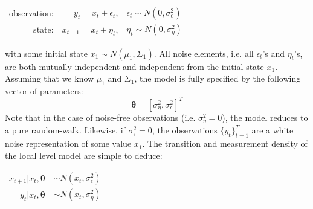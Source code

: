 \documentclass[11pt, oneside]{scrreprt}   	%
\begin{document}
\begin{center}
\begin{tabular}{ r r l }
  observation: & $y_t = x_t + \epsilon_t$, & $\epsilon_t \sim N(0,\sigma_{\epsilon}^2)$ \\
  state: & $x_{t+1} = x_t + \eta_t$, & $\eta_t \sim N(0,\sigma_{\eta}^2)$ \\
\end{tabular}
\end{center}
\bigskip
with some initial state $x_1 \sim N(\mu_1, \Sigma_1)$. All noise elements, i.e. all $\epsilon_t$'s and $\eta_t$'s, are both mutually independent and independent from the initial state $x_1$. Assuming that we know $\mu_1$ and $\Sigma_1$, the model is fully specified by the following vector of parameters:
$$
\boldsymbol{\theta} = [\sigma_{\eta}^2,  \sigma_{\epsilon}^2]^T
$$
Note that in the case of noise-free observations (i.e. $\sigma_{\eta}^2 = 0$), the model reduces to a pure random-walk. Likewise, if $\sigma_{\epsilon}^2 = 0$, the observations $\{y_t\}_{t=1}^T$ are a white noise representation of some value $x_1$. The transition and measurement density of the local level model are simple to deduce:
\begin{center}
\begin{tabular}{ r l }
  $x_{t+1} | x_t, \boldsymbol{\theta}$ & $\sim N(x_t,\sigma_{\epsilon}^2)$ \\
  $y_t | x_t, \boldsymbol{\theta}$ & $\sim N(x_t,\sigma_{\eta}^2)$ \\
\end{tabular}
\end{center}
\bigskip

\end{document}
